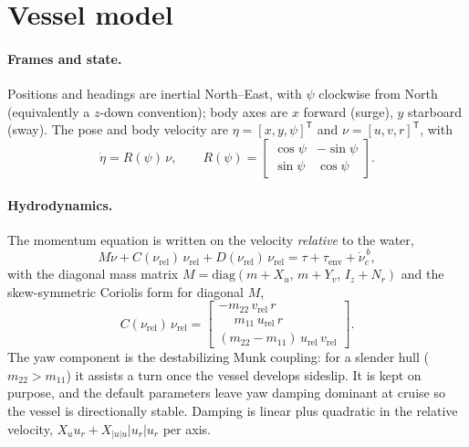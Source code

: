 \documentclass[10pt]{article}
\begin{document}
\section{Vessel model}
\label{sec:model}
\paragraph{Frames and state.}
Positions and headings are inertial North--East, with $\psi$ clockwise from
North (equivalently a $z$-down convention); body axes are $x$ forward
(surge), $y$ starboard (sway). The pose and body velocity are
$\eta=[x,y,\psi]^\mathsf{T}$ and $\nu=[u,v,r]^\mathsf{T}$, with
\begin{equation}
  \dot\eta = R(\psi)\,\nu, \qquad
  R(\psi)=
  \begin{bmatrix}
    \cos\psi & -\sin\psi \\
    \sin\psi & \cos\psi
  \end{bmatrix}.
\end{equation}

\paragraph{Hydrodynamics.}
The momentum equation is written on the velocity \emph{relative} to the
water,
\begin{equation}
  \label{eq:momentum}
  M\dot\nu + C(\nu_{\mathrm{rel}})\,\nu_{\mathrm{rel}}
  + D(\nu_{\mathrm{rel}})\,\nu_{\mathrm{rel}}
  = \tau + \tau_{\mathrm{env}} + \dot\nu_c^{\,b},
\end{equation}
with the diagonal mass matrix
$M=\mathrm{diag}(m+X_{\dot u},\, m+Y_{\dot v},\, I_z+N_{\dot r})$ and the
skew-symmetric Coriolis form for diagonal $M$,
\begin{equation}
  C(\nu_{\mathrm{rel}})\,\nu_{\mathrm{rel}} =
  \begin{bmatrix}
    -m_{22}\,v_{\mathrm{rel}}\,r \\
    \phantom{-}m_{11}\,u_{\mathrm{rel}}\,r \\
    (m_{22}-m_{11})\,u_{\mathrm{rel}}\,v_{\mathrm{rel}}
  \end{bmatrix}.
\end{equation}
The yaw component is the destabilizing Munk coupling: for a slender hull
($m_{22}>m_{11}$) it assists a turn once the vessel develops sideslip. It
is kept on purpose, and the default parameters leave yaw damping dominant
at cruise so the vessel is directionally stable. Damping is linear plus
quadratic in the relative velocity,
$X_u u_r + X_{|u|u}|u_r|u_r$ per axis.
\end{document}
